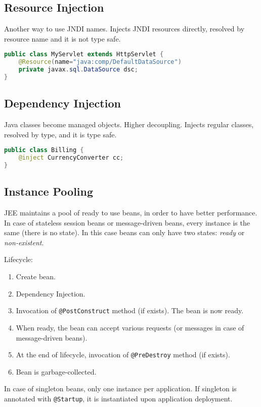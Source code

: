 \subsection{Resource Injection}
Another way to use JNDI names.
Injects JNDI resources directly, resolved by resource name and it is not type safe.
\begin{lstlisting}[language=Java]
public class MyServlet extends HttpServlet {
    @Resource(name="java:comp/DefaultDataSource")
    private javax.sql.DataSource dsc;
}
\end{lstlisting}

\subsection{Dependency Injection}
Java classes become managed objects.
Higher decoupling.
Injects regular classes, resolved by type, and it is type safe.
\begin{lstlisting}[language=Java]
public class Billing {
    @inject CurrencyConverter cc;
}
\end{lstlisting}

\subsection{Instance Pooling}
JEE maintains a pool of ready to use beans, in order to have better performance.
In case of stateless session beans or message-driven beans, every instance is the same (there is no state).
In this case beans can only have two states: \emph{ready} or \emph{non-existent}.

Lifecycle:
\begin{enumerate}
    \item Create bean.
    \item Dependency Injection.
    \item Invocation of \lstinline{@PostConstruct} method (if exists).
    The bean is now ready.
    \item When ready, the bean can accept various requests (or messages in case of message-driven beans).
    \item At the end of lifecycle, invocation of \lstinline{@PreDestroy} method (if exists).
    \item Bean is garbage-collected.
\end{enumerate}

In case of singleton beans, only one instance per application.
If singleton is annotated with \lstinline{@Startup}, it is instantiated upon application deployment.

